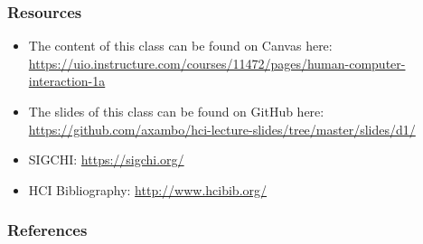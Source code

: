 \documentclass[screen, aspectratio=43]{beamer}
\begin{document}
%
\begin{frame}
\frametitle{Resources}
\begin{itemize}
\item The content of this class can be found on Canvas here:\\
\url{https://uio.instructure.com/courses/11472/pages/human-computer-interaction-1a}
\item The slides of this class can be found on GitHub here: \\
\url{https://github.com/axambo/hci-lecture-slides/tree/master/slides/d1/}
\item SIGCHI: \url{https://sigchi.org/}
\item HCI Bibliography: \url{http://www.hcibib.org/}
\end{itemize}
\end{frame}
%
\begin{frame}
  \frametitle{References}
  \printbibliography
\end{frame}
%
\end{document}
